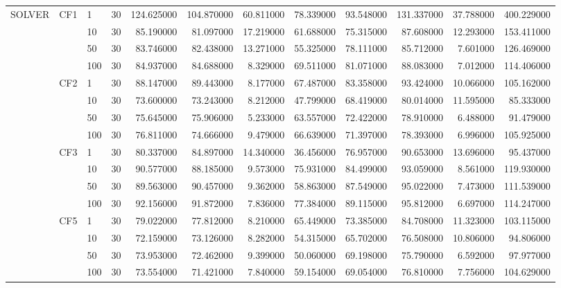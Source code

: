 \begin{tabular}{lllrrrrrrrrr}
\cline{1-12} \cline{2-12}
\multirow[t]{16}{*}{SOLVER} & \multirow[t]{4}{*}{CF1} & 1 & 30 & 124.625000 & 104.870000 & 60.811000 & 78.339000 & 93.548000 & 131.337000 & 37.788000 & 400.229000 \\
 &  & 10 & 30 & 85.190000 & 81.097000 & 17.219000 & 61.688000 & 75.315000 & 87.608000 & 12.293000 & 153.411000 \\
 &  & 50 & 30 & 83.746000 & 82.438000 & 13.271000 & 55.325000 & 78.111000 & 85.712000 & 7.601000 & 126.469000 \\
 &  & 100 & 30 & 84.937000 & 84.688000 & 8.329000 & 69.511000 & 81.071000 & 88.083000 & 7.012000 & 114.406000 \\
\cline{2-12}
 & \multirow[t]{4}{*}{CF2} & 1 & 30 & 88.147000 & 89.443000 & 8.177000 & 67.487000 & 83.358000 & 93.424000 & 10.066000 & 105.162000 \\
 &  & 10 & 30 & 73.600000 & 73.243000 & 8.212000 & 47.799000 & 68.419000 & 80.014000 & 11.595000 & 85.333000 \\
 &  & 50 & 30 & 75.645000 & 75.906000 & 5.233000 & 63.557000 & 72.422000 & 78.910000 & 6.488000 & 91.479000 \\
 &  & 100 & 30 & 76.811000 & 74.666000 & 9.479000 & 66.639000 & 71.397000 & 78.393000 & 6.996000 & 105.925000 \\
\cline{2-12}
 & \multirow[t]{4}{*}{CF3} & 1 & 30 & 80.337000 & 84.897000 & 14.340000 & 36.456000 & 76.957000 & 90.653000 & 13.696000 & 95.437000 \\
 &  & 10 & 30 & 90.577000 & 88.185000 & 9.573000 & 75.931000 & 84.499000 & 93.059000 & 8.561000 & 119.930000 \\
 &  & 50 & 30 & 89.563000 & 90.457000 & 9.362000 & 58.863000 & 87.549000 & 95.022000 & 7.473000 & 111.539000 \\
 &  & 100 & 30 & 92.156000 & 91.872000 & 7.836000 & 77.384000 & 89.115000 & 95.812000 & 6.697000 & 114.247000 \\
\cline{2-12}
 & \multirow[t]{4}{*}{CF5} & 1 & 30 & 79.022000 & 77.812000 & 8.210000 & 65.449000 & 73.385000 & 84.708000 & 11.323000 & 103.115000 \\
 &  & 10 & 30 & 72.159000 & 73.126000 & 8.282000 & 54.315000 & 65.702000 & 76.508000 & 10.806000 & 94.806000 \\
 &  & 50 & 30 & 73.953000 & 72.462000 & 9.399000 & 50.060000 & 69.198000 & 75.790000 & 6.592000 & 97.977000 \\
 &  & 100 & 30 & 73.554000 & 71.421000 & 7.840000 & 59.154000 & 69.054000 & 76.810000 & 7.756000 & 104.629000 \\
\cline{1-12} \cline{2-12}
\bottomrule
\end{tabular}
